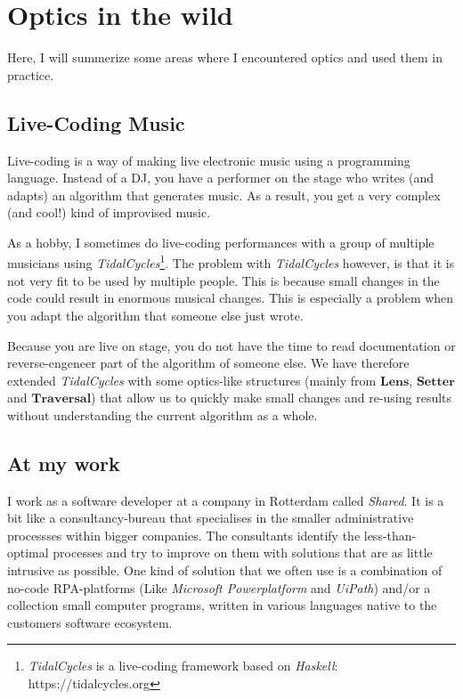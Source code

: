 \documentclass{article}
\begin{document}
\pagebreak

\section{Optics in the wild}

Here, I will summerize some areas where I encountered optics and used them in practice.

\subsection{Live-Coding Music}

Live-coding is a way of making live electronic music using a programming language. Instead of a DJ, you have a performer on the stage who writes (and adapts) an algorithm that generates music. As a result, you get a very complex (and cool!) kind of improvised music.

As a hobby, I sometimes do live-coding performances with a group of multiple musicians using \emph{TidalCycles}\footnote{\emph{TidalCycles} is a live-coding framework based on \emph{Haskell}: https://tidalcycles.org}. The problem with \emph{TidalCycles} however, is that it is not very fit to be used by multiple people. This is because small changes in the code could result in enormous musical changes. This is especially a problem when you adapt the algorithm that someone else just wrote.

Because you are live on stage, you do not have the time to read documentation or reverse-engeneer part of the algorithm of someone else. We have therefore extended \emph{TidalCycles} with some optics-like structures (mainly from $\mathbf{Lens}$, $\mathbf{Setter}$ and $\mathbf{Traversal}$) that allow us to quickly make small changes and re-using results without understanding the current algorithm as a whole.

\subsection{At my work}

I work as a software developer at a company in Rotterdam called \emph{Shared}. It is a bit like a consultancy-bureau that specialises in the smaller administrative processses within bigger companies. The consultants identify the less-than-optimal processes and try to improve on them with solutions that are as little intrusive as possible. One kind of solution that we often use is a combination of no-code RPA-platforms (Like \emph{Microsoft Powerplatform} and \emph{UiPath}) and/or a collection small computer programs, written in various languages native to the customers software ecosystem.
\end{document}

